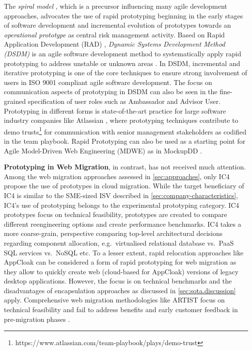 The \emph{spiral model} \autocite{Boehm1988Spiral}, which is a precursor influencing many agile development approaches, advocates the use of rapid prototyping beginning in the early stages of software development and incremental evolution of prototypes towards an \emph{operational prototype} \autocite[cf.~operational product][]{ISO/IEEE24765Vocabulary} as central risk management activity.
Based on Rapid Application Development (RAD) \autocite{Martin1991RAD}, \emph{Dynamic Systems Development Method (DSDM)} \autocite{Stapleton1997DSDM,DSDMConsortium2014} is an agile software development method to systematically apply rapid prototyping to address unstable or unknown areas \autocite{Highsmith2001}.
In DSDM, incremental and iterative prototyping is one of the core techniques to ensure strong involvement of users in ISO 9001 compliant agile software development.
The focus on communication aspects of prototyping in DSDM can also be seen in the fine-grained specification of user roles such as Ambassador and Advisor User.
Prototyping in different forms is state-of-the-art practice for large software industry companies like Atlassian \autocite{Simpson2016}, where prototyping techniques contribute to demo trusts\footnote{https://www.atlassian.com/team-playbook/plays/demo-trust} for communication with senior management stakeholders as codified in the team playbook.
Rapid Prototyping can also be used as a starting point for Agile Model-Driven Web Engineering (MDWE) as in MockupDD \autocite{Rivero2013MockupDD,Rivero2013,Rivero2014Electra}.

\textbf{Prototyping in Web Migration}, in contrast, has not received much attention.
Among the web migration approaches assessed in \cref{sec:approaches}, only IC4 \autocite{Fowley2017CloudSME} propose the use of prototypes in cloud migration.
While the target beneficiary of IC4 is similar to the SME-sized ISV described in \cref{sec:company-characteristics}, IC4's use of prototyping belongs to the experimental prototyping \autocite{Wallmueller2001SoftwareQuality} category.
IC4 prototypes focus on technical feasibility, prototypes are created to compare different reengineering options and create performance benchmarks.
IC4 takes a more coarse-grain, perspective comparing top-level architectural decisions regarding component allocation, e.g.~virtualised relational database vs.~PaaS SQL services vs.~NoSQL etc.
To a lesser extent, rapid relocation approaches like AppCloak \autocite{Tak2014} can be considered a form of rapid prototyping for web migration as they allow to quickly create web (cloud-based for AppCloak) versions of legacy desktop applications.
However, the focus is on technical benchmarks and the disadvantages of encapsulation approaches as discussed in \cref{sec:sota.discussion} apply.
Comprehensive web migration methodologies like ARTIST focus on technical feasibility and fail to address benefits and early customer feedback in pre-migration phases \autocite{ARTIST2014Methodology}.

